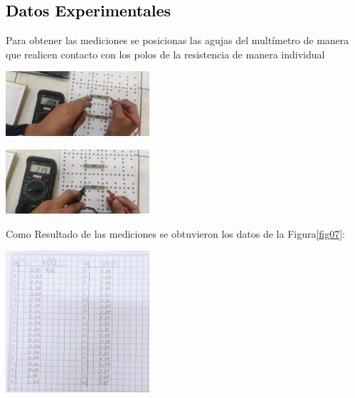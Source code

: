 \documentclass[11pt]{article}
\begin{document}
\begin{multicols}{2}
        \subsection{\textbf{\textcolor{black}{Datos Experimentales}}}
        \noindent Para obtener las mediciones se posicionas las agujas del multímetro de manera
        que realicen contacto con los polos de la resistencia de manera individual

        \begin{center}
            \includegraphics[width=0.4\textwidth]{img-1/med1}
        \end{center}
        \begin{center}
            \includegraphics[width=0.4\textwidth]{img-1/med2}
        \end{center}
        Como Resultado de las mediciones se obtuvieron los datos de la Figura\ref{fig07}:
        \begin{center}
            \includegraphics[width=0.4\textwidth]{img-1/mediciones}
        \end{center}
        

\end{multicols}
\end{document}
